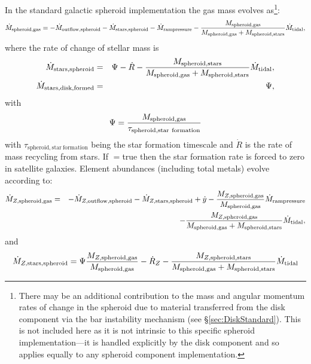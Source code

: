 In the standard galactic spheroid implementation the gas mass evolves as\footnote{There may be an additional contribution to the mass and angular momentum rates of change in the spheroid due to material transferred from the disk \gls{component} via the bar instability mechanism (see \S\protect\ref{sec:DiskStandard}). This is not included here as it is not intrinsic to this specific spheroid implementation---it is handled explicitly by the disk \gls{component} and so applies equally to any spheroid \gls{component} implementation.}:
\begin{equation}
 \dot{M}_\mathrm{spheroid, gas} = - \dot{M}_\mathrm{outflow, spheroid} - \dot{M}_\mathrm{stars, spheroid} - \dot{M}_\mathrm{ram pressure} - {M_\mathrm{spheroid, gas} \over M_\mathrm{spheroid, gas} + M_\mathrm{spheroid, stars}} \dot{M}_\mathrm{tidal},
\end{equation}
where the rate of change of stellar mass is
\begin{eqnarray}
 \dot{M}_\mathrm{stars, spheroid} &=& \Psi - \dot{R} - {M_\mathrm{spheroid, stars} \over M_\mathrm{spheroid, gas} + M_\mathrm{spheroid, stars}} \dot{M}_\mathrm{tidal}, \\
 \dot{M}_\mathrm{stars, disk, formed } &=& \Psi,
\end{eqnarray}
with
\begin{equation}
 \Psi = {M_\mathrm{spheroid, gas} \over \tau_\mathrm{spheroid, star~formation}}
\end{equation}
with $\tau_\mathrm{spheroid, star~formation}$ being the star formation timescale and $\dot{R}$ is the rate of mass recycling from stars. If {\normalfont \ttfamily [spheroidStarFormationInSatellites]}$=${\normalfont \ttfamily true} then the star formation rate is forced to zero in satellite galaxies. Element abundances (including total metals) evolve according to:
\begin{eqnarray}
  \dot{M}_{Z, \mathrm{spheroid, gas}} &=& - \dot{M}_{Z, \mathrm{outflow, spheroid}} - \dot{M}_{Z, \mathrm{stars, spheroid}} + \dot{y} - {M_{Z, \mathrm{spheroid, gas}} \over M_\mathrm{spheroid, gas}} \dot{M}_\mathrm{ram pressure} \nonumber \\ 
 & & - {M_{Z, \mathrm{spheroid, gas}} \over M_\mathrm{spheroid, gas} + M_\mathrm{spheroid, stars}} \dot{M}_\mathrm{tidal},
\end{eqnarray}
and
\begin{equation}
 \dot{M}_{Z, \mathrm{stars, spheroid}} = \Psi {M_{Z, \mathrm{spheroid, gas}} \over M_\mathrm{spheroid, gas}} - \dot{R}_Z - {M_{Z, \mathrm{spheroid, stars}} \over M_\mathrm{spheroid, gas} + M_\mathrm{spheroid, stars}} \dot{M}_\mathrm{tidal}
\end{equation}
